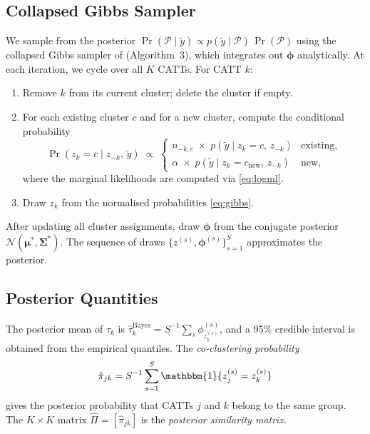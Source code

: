 \documentclass[margin=3in, 12pt]{article}
\newcommand{\Normal}{\mathcal{N}}
\newcommand{\1}{\mathbbm{1}}
\begin{document}
\subsection{Collapsed Gibbs Sampler}

We sample from the posterior $\Pr(\mathcal{P}\mid\tilde{y}) \propto
p(\tilde{y}\mid\mathcal{P})\,\Pr(\mathcal{P})$ using the collapsed Gibbs
sampler of \citet{neal2000} (Algorithm~3), which integrates out $\bm{\phi}$
analytically. At each iteration, we cycle over all $K$ CATTs. For CATT $k$:
\begin{enumerate}[nosep]
  \item Remove $k$ from its current cluster; delete the cluster if empty.
  \item For each existing cluster $c$ and for a new cluster, compute the
    conditional probability
    \begin{equation}
      \Pr(z_k = c \mid z_{-k},\,\tilde{y})
      \;\propto\;
      \begin{cases}
        n_{-k,c}\;\times\; p(\tilde{y}\mid z_k = c,\, z_{-k}) & \text{existing},\\[4pt]
        \alpha \;\times\; p(\tilde{y}\mid z_k = c_{\text{new}},\, z_{-k}) & \text{new},
      \end{cases}
      \label{eq:gibbs}
    \end{equation}
    where the marginal likelihoods are computed via \eqref{eq:logml}.
  \item Draw $z_k$ from the normalised probabilities \eqref{eq:gibbs}.
\end{enumerate}
After updating all cluster assignments, draw $\bm{\phi}$ from the
conjugate posterior $\Normal(\bm{\mu}^*, \bm{\Sigma}^*)$. The sequence of
draws $\{z^{(s)}, \bm{\phi}^{(s)}\}_{s=1}^S$ approximates the posterior.

\subsection{Posterior Quantities}

The posterior mean of $\tau_k$ is
$\hat\tau_k^{\text{Bayes}} = S^{-1}\sum_s \phi_{z_k^{(s)}}^{(s)}$,
and a 95\% credible interval is obtained from the empirical quantiles.
The \emph{co-clustering probability}
\begin{equation}
  \hat\pi_{jk} = S^{-1}\sum_{s=1}^{S} \1\{z_j^{(s)} = z_k^{(s)}\}
\end{equation}
gives the posterior probability that CATTs $j$ and $k$ belong to the same
group. The $K \times K$ matrix $\hat\Pi = [\hat\pi_{jk}]$ is the
\emph{posterior similarity matrix}.
\end{document}

